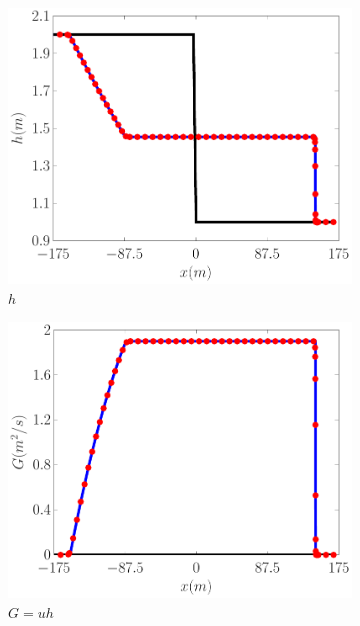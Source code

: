 \documentclass[10pt]{elsarticle}
\begin{document}
\begin{figure}
	\centering
	\begin{subfigure}{0.32\textwidth}
		\centering
		\includegraphics[width=\textwidth]{./Figures/Simulations/Validation/DBSWWE/hEx.pdf}
		\caption{$h$}
	\end{subfigure}
	\begin{subfigure}{0.32\textwidth}
		\centering
		\includegraphics[width=\textwidth]{./Figures/Simulations/Validation/DBSWWE/GEx.pdf}
		\caption{$G = uh$}
	\end{subfigure}
	\begin{subfigure}{0.32\textwidth}

\end{subfigure}
\end{figure}
\end{document}
